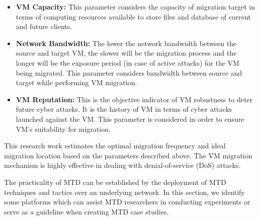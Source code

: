 \begin{itemize}
    \item \textbf{VM Capacity:} This parameter considers the capacity of migration target in terms of computing resources available to store files and database of current and future clients.
    \item \textbf{Network Bandwidth:} The lower the network bandwidth between the source and target VM, the slower will be the migration process and the longer will be the exposure period (in case of active attacks) for the VM being migrated. This parameter considers bandwidth between source and target while performing VM migration.
    \item \textbf{VM Reputation:} This is the objective indicator of VM robustness to deter future cyber attacks. It is the history of VM in terms of cyber attacks launched against the VM. This parameter is considered in order to ensure VM’s suitability for migration.
\end{itemize}
This research work estimates the optimal migration frequency and ideal migration location based on the parameters described above. The VM migration mechanism is highly effective in dealing with denial-of-service (DoS) attacks.

\label{testbed}
 The practicality of MTD can be established by the deployment of MTD techniques and tactics over an underlying network. In this section, we identify some platforms which can assist MTD researchers in conducting experiments or serve as a guideline when creating MTD case studies.

